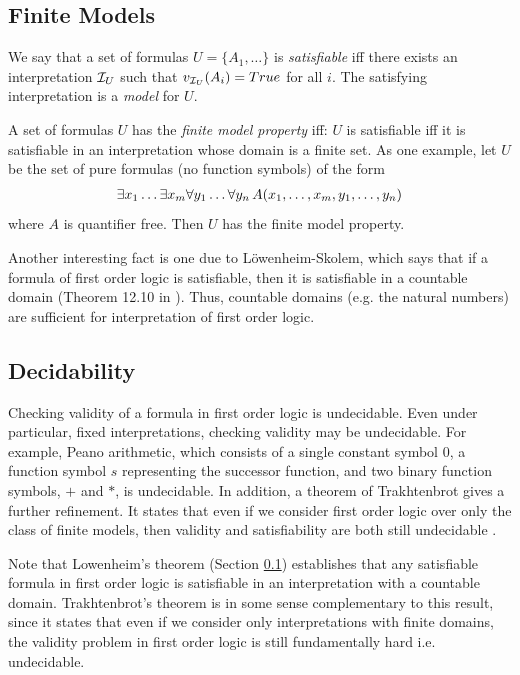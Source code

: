 \documentclass[10pt]{article}
\begin{document}
\subsection{Finite Models}
\label{sec:finite-models}

We say that a set of formulas $U=\{A_1,\dots\}$ is \textit{satisfiable} iff there exists an interpretation $\mathcal{I}_U$ such that $v_{\mathcal{I}_U}(A_i)=True$ for all $i$. The satisfying interpretation is a \textit{model} for $U$. 

A set of formulas $U$ has the \textit{finite model property} iff: $U$ is satisfiable iff it is satisfiable in an interpretation whose domain is a finite set. As one example, let $U$ be the set of pure formulas (no function symbols) of the form 
\begin{align*}
    \exists x_1 \dots \exists x_m \forall y_1 \dots \forall y_n \, A(x_1,\dots,x_m,y_1,\dots,y_n)
\end{align*}
where $A$ is quantifier free. Then $U$ has the finite model property.

Another interesting fact is one due to L\"{o}wenheim-Skolem, which says that if a formula of first order logic is satisfiable, then it is satisfiable in a countable domain (Theorem 12.10 in \cite{2012benari}). Thus, countable domains (e.g. the natural numbers) are sufficient for interpretation of first order logic.

\subsection{Decidability}

Checking validity of a formula in first order logic is undecidable. Even under particular, fixed interpretations, checking validity may be undecidable. For example, Peano arithmetic, which consists of a single constant symbol $0$, a function symbol $s$ representing the successor function, and two binary function symbols, $+$ and $*$, is undecidable. In addition, a theorem of Trakhtenbrot gives a further refinement. It states that even if we consider first order logic over only the class of finite models, then validity and satisfiability are both still undecidable \cite{libkin2004elements}. 

Note that Lowenheim's theorem (Section \ref{sec:finite-models}) establishes that any satisfiable formula in first order logic is satisfiable in an interpretation with a countable domain. Trakhtenbrot's theorem is in some sense complementary to this result, since it states that even if we consider only interpretations with finite domains, the validity problem in first order logic is still fundamentally hard i.e. undecidable.
\end{document}
